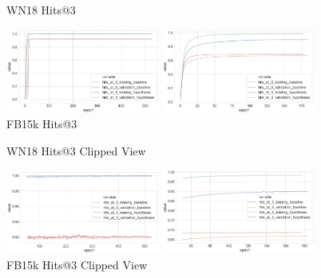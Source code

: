 \begin{figure}[H]
	\parbox{.5\linewidth}{
   		\caption{WN18 Hits@3}
   		\centering
    		\includegraphics[width=0.45\textwidth, height=0.2\textheight]{WN18_hits_at_3_Results}
		}
	\hfill
	\parbox{.5\linewidth}{
		\caption{FB15k Hits@3}
   		\centering
		\includegraphics[width=0.45\textwidth, height=0.2\textheight]{FB15k_hits_at_3_Results}
		}
\end{figure}

\begin{figure}[H]
	\parbox{.5\linewidth}{
   		\caption{WN18 Hits@3 Clipped View}
   		\centering
    		\includegraphics[width=0.45\textwidth, height=0.2\textheight]{WN18_hits_at_3_Results_Clipped}
		}
	\hfill
	\parbox{.5\linewidth}{
		\caption{FB15k Hits@3  Clipped View}
   		\centering
		\includegraphics[width=0.45\textwidth, height=0.2\textheight]{FB15k_hits_at_3_Results_Clipped}
		}
\end{figure}


